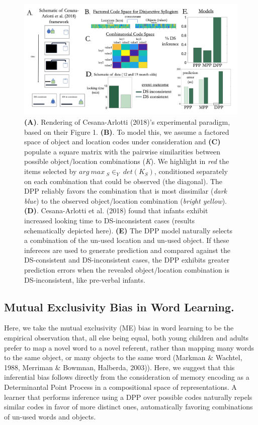 \documentclass[10pt,letterpaper]{article}
\begin{document}
\begin{figure}[h]
  \centering \includegraphics[width=\textwidth]{Figure3.png}
  \caption{\textbf{(A)}. Rendering of Cesana-Arlotti (2018)'s experimental paradigm, based on their Figure 1. \textbf{(B)}. To model this, we assume a factored space of object and location codes under consideration and \textbf{(C)} populate a square matrix with the pairwise similarities between possible object/location combinations (\textit{K}). We highlight in \textit{red} the items selected by  \(arg\ max \ _S\in_Y \ det(K _{S})\), conditioned separately on each combination that could be observed (the diagonal). The DPP reliably favors the combination that is most dissimilar (\textit{dark blue}) to the observed object/location combination (\textit{bright yellow}).  \textbf{(D)}. Cesana-Arlotti et al. (2018) found that infants exhibit increased looking time to DS-inconsistent cases (results schematically depicted here). \textbf{(E)} The DPP model naturally selects a combination of the un-used location and un-used object. If these infereces are used to generate prediction and compared against the DS-consistent and DS-inconsistent cases, the DPP exhibits greater prediction errors when the revealed object/location combination is DS-inconsistent, like pre-verbal infants.}
\end{figure}

\subsection{Mutual Exclusivity Bias in Word Learning.}

 Here, we take the mutual exclusivity (ME) bias in word learning to be the empirical observation that, all else being equal, both young children and adults prefer to map a novel word to a novel referent, rather than mapping many words to the same object, or many objects to the same word (Markman \& Wachtel, 1988, Merriman \& Bowmnan, Halberda, 2003)). Here, we suggest that this inferential bias follows directly from the consideration of memory encoding as a Determinantal Point Process in a compositional space of representations. A learner that performs inference using a DPP over possible codes naturally repels similar codes in favor of more distinct ones, automatically favoring combinations of un-used words and objects.
\end{document}
